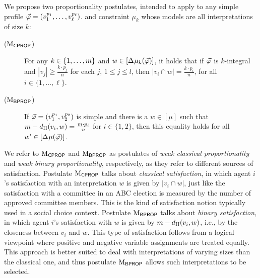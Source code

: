 We propose two proportionality postulates,
intended to apply to any simple profile $\P=(v_1^{p_1},\dots,v_\ell^{p_\ell})$.
and constraint $\mu_k$ 
whose models are all interpretations of size $k$:
\begin{description}
	\item[($\ppm{\CPROP}$)] For any $k\in\set{1,\dots,m}$ and $w\in\mods{\me^{}{\mu_k}(\P)}$, 
	it holds that if $\P$ is $k$-integral and $|v_j|\geq \frac{k\cdot p_j}{n}$ for each $j$, $1 \le j \le l$, then %
	$|v_i\cap w|=\frac{k\cdot p_i}{n}$,
	for all $i\in\{1,\dots,\ell\}$. 
	\item[($\ppm{\BPROP}$)] If $\P=(v_1^{p_1},v_2^{p_2})$ is simple 
	and there is a $w\in[\mu]$ such that
	$m-\dd_\hamming(v_i,w)=\frac{m\cdot p_i}{n}$ for $i\in\{1,2\}$,
	\label{eq:bp}
	then 
	this equality
	holds for all $w'\in\mods{\me^{}{\mu}(\P)}$.
\end{description}
We refer to $\ppm{\CPROP}$ and $\ppm{\BPROP}$ as postulates of
\emph{weak classical  proportionality} and \emph{weak binary proportionality}, respectively,
as they refer to different sources of satisfaction.
Postulate $\ppm{\CPROP}$ talks about \emph{classical  satisfaction}, 
in which agent $i$'s satisfaction with an interpretation $w$ is given by $|v_i\cap w|$, 
just like the satisfaction with a committee in an ABC election is measured by the number 
of approved committee members.
This is the kind of satisfaction notion typically used in a social choice context.
Postulate $\ppm{\BPROP}$ talks about \emph{binary satisfaction},
in which agent $i$'s satisfaction with $w$ is given by $m-\dd_\hamming(v_i,w)$,
i.e., by the closeness between $v_i$ and $w$.
This type of satisfaction
follows from a logical viewpoint where positive and negative variable assignments are treated equally. 
This approach is better suited to deal with interpretations of varying sizes
than the classical  one,
and thus postulate $\ppm{\BPROP}$ allows such interpretations to be selected.

